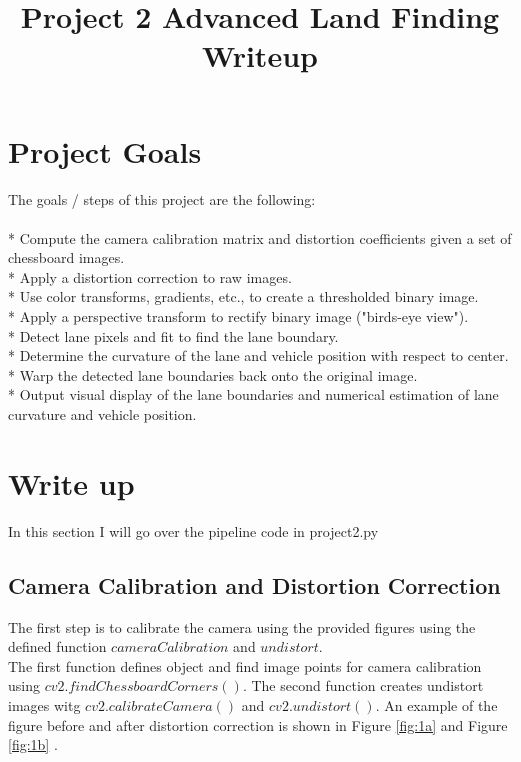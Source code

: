 \documentclass{article}
\title{Project 2 Advanced Land Finding Writeup}
\begin{document}
\maketitle
\section{Project Goals}

The goals / steps of this project are the following:\\\\
* Compute the camera calibration matrix and distortion coefficients given a set of chessboard images.\\
* Apply a distortion correction to raw images.\\
* Use color transforms, gradients, etc., to create a thresholded binary image.\\
* Apply a perspective transform to rectify binary image ("birds-eye view").\\
* Detect lane pixels and fit to find the lane boundary.\\
* Determine the curvature of the lane and vehicle position with respect to center.\\
* Warp the detected lane boundaries back onto the original image.\\
* Output visual display of the lane boundaries and numerical estimation of lane curvature and vehicle position.\\

\section{Write up}
In this section I will go over the pipeline code in project2.py
\subsection{Camera Calibration and Distortion Correction} 
The first step is to calibrate the camera using the provided figures using the defined function $cameraCalibration$ and $undistort$. \\
The first function defines object and find image points for camera calibration using $cv2.findChessboardCorners()$. The second function creates undistort images witg $cv2.calibrateCamera()$ and $cv2.undistort()$. An example of the figure before and after distortion correction is shown in Figure \ref{fig:1a} and Figure \ref{fig:1b} .
\end{document}
